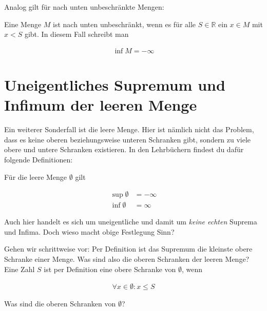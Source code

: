 \documentclass[fontsize=9pt,
               parskip=half-,
               DIV=14,
               listof=chapterentry,
               tocflat]{scrbook}
\begin{document}
Analog gilt für nach unten unbeschränkte Mengen:

\begin{definition*}
Eine Menge $M$ ist nach unten unbeschränkt, wenn es für alle $S\in \mathbb {R} $ ein $x\in M$ mit $x<S$ gibt. In diesem Fall schreibt man

\begin{align*}
\inf M=-\infty 
\end{align*}

\end{definition*}

\section{Uneigentliches Supremum und Infimum der leeren Menge}

Ein weiterer Sonderfall ist die leere Menge. Hier ist nämlich nicht das Problem, dass es keine oberen beziehungsweise unteren Schranken gibt, sondern zu viele obere und untere Schranken existieren. In den Lehrbüchern findest du dafür folgende Definitionen:

\begin{definition*}
Für die leere Menge $\emptyset $ gilt

\begin{align*}
\sup \emptyset &=-\infty \\\inf \emptyset &=\infty 
\end{align*}

\end{definition*}

Auch hier handelt es sich um uneigentliche und damit um \emph{keine echten} Suprema und Infima. Doch wieso macht obige Festlegung Sinn?

Gehen wir schrittweise vor: Per Definition ist das Supremum die kleinste obere Schranke einer Menge. Was sind also die oberen Schranken der leeren Menge? Eine Zahl $S$ ist per Definition eine obere Schranke von $\emptyset $, wenn

\begin{align*}
\forall x\in \emptyset :x\leq S
\end{align*}

\begin{mdframed}[style=semanticbox,frametitleaboveskip=3pt,innerbottommargin=3pt,frametitle=Frage]
Was sind die oberen Schranken von $\emptyset $?

\end{mdframed}
\end{document}
